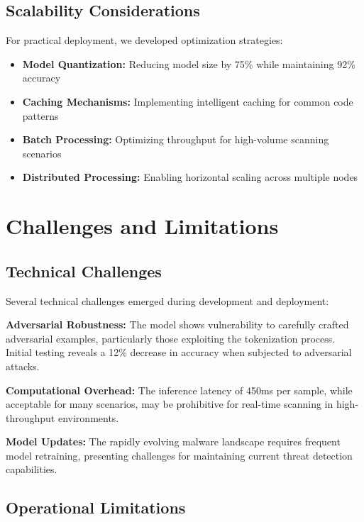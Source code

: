 \documentclass[12pt,a4paper]{article}
\begin{document}
\subsection{Scalability Considerations}

For practical deployment, we developed optimization strategies:

\begin{itemize}
    \item \textbf{Model Quantization:} Reducing model size by 75\% while maintaining 92\% accuracy
    \item \textbf{Caching Mechanisms:} Implementing intelligent caching for common code patterns
    \item \textbf{Batch Processing:} Optimizing throughput for high-volume scanning scenarios
    \item \textbf{Distributed Processing:} Enabling horizontal scaling across multiple nodes
\end{itemize}

\section{Challenges and Limitations}

\subsection{Technical Challenges}

Several technical challenges emerged during development and deployment:

\textbf{Adversarial Robustness:} The model shows vulnerability to carefully crafted adversarial examples, particularly those exploiting the tokenization process. Initial testing reveals a 12\% decrease in accuracy when subjected to adversarial attacks.

\textbf{Computational Overhead:} The inference latency of 450ms per sample, while acceptable for many scenarios, may be prohibitive for real-time scanning in high-throughput environments.

\textbf{Model Updates:} The rapidly evolving malware landscape requires frequent model retraining, presenting challenges for maintaining current threat detection capabilities.

\subsection{Operational Limitations}
\end{document}
